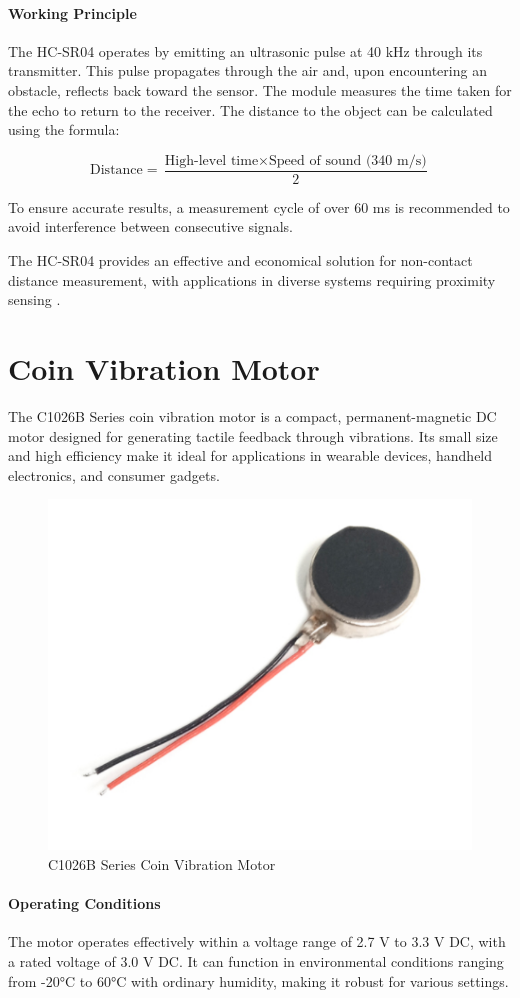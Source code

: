 \paragraph{Working Principle}

The HC-SR04 operates by emitting an ultrasonic pulse at 40 kHz through its transmitter. This pulse propagates through the air and, upon encountering an obstacle, reflects back toward the sensor. The module measures the time taken for the echo to return to the receiver. The distance to the object can be calculated using the formula:

\[
\text{Distance} = \frac{\text{High-level time} \times \text{Speed of sound (340 m/s)}}{2}
\]

To ensure accurate results, a measurement cycle of over 60 ms is recommended to avoid interference between consecutive signals.



The HC-SR04 provides an effective and economical solution for non-contact distance measurement, with applications in diverse systems requiring proximity sensing \cite{HCSR04Datasheet}. 


\section{Coin Vibration Motor}

The C1026B Series coin vibration motor is a compact, permanent-magnetic DC motor designed for generating tactile feedback through vibrations. Its small size and high efficiency make it ideal for applications in wearable devices, handheld electronics, and consumer gadgets.

\begin{figure}[h]
	\centering
	\includegraphics[width=0.4\linewidth]{assets/ch2/vibration_motor}
	\caption{C1026B Series Coin Vibration Motor}
	\label{fig:coin_motor}
\end{figure}

\paragraph{Operating Conditions}
The motor operates effectively within a voltage range of 2.7 V to 3.3 V DC, with a rated voltage of 3.0 V DC. It can function in environmental conditions ranging from -20°C to 60°C with ordinary humidity, making it robust for various settings. 


